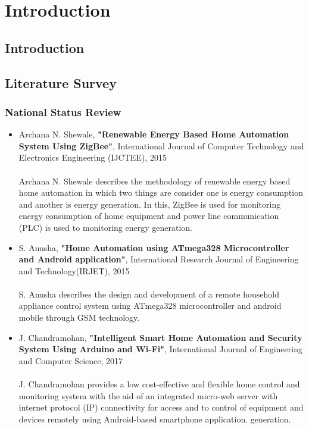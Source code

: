 \chapter{Introduction}
        \section{Introduction}
        \section{Literature Survey}
        	\subsection{National Status Review}
        	\begin{itemize}
        		\item Archana N. Shewale, \textbf{"Renewable Energy Based Home Automation System Using ZigBee"}, International Journal of Computer Technology and Electronics Engineering (IJCTEE), 2015\\ \\
        		Archana N. Shewale describes the methodology of renewable energy based home automation in which two things are consider one is energy consumption and another is energy generation. In this, ZigBee is used for monitoring energy consumption of home equipment and power line communication (PLC) is used to monitoring energy generation.
        		\item S. Anusha, \textbf{"Home Automation using ATmega328 Microcontroller and Android application"}, International Research Journal of Engineering and Technology(IRJET), 2015\\ \\
        		S. Anusha describes the design and development of a remote household appliance control system using ATmega328 microcontroller and android mobile through GSM technology.
        		\item J. Chandramohan, \textbf{"Intelligent Smart Home Automation and Security System Using Arduino and Wi-Fi"}, International Journal of Engineering and Computer Science, 2017\\ \\
        		J. Chandramohan provides a low cost-effective and flexible home control and monitoring system with the aid of an integrated micro-web server with internet protocol (IP) connectivity for access and to control of equipment and devices remotely using Android-based smartphone application. generation.
        	\end{itemize}
